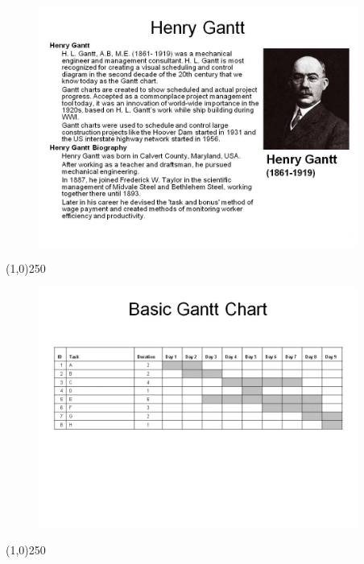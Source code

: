 \begin{frame}
\begin{figure}
	\centering
		\includegraphics[width = 10.5cm]{oldnotes/Slide33.jpg}
\end{figure}
\end{frame}
\begin{center}\line(1,0){250}\end{center}





\begin{frame}
\begin{figure}
	\centering
		\includegraphics[width = 10.5cm]{oldnotes/Slide34.jpg}
\end{figure}
\end{frame}
\begin{center}\line(1,0){250}\end{center}





